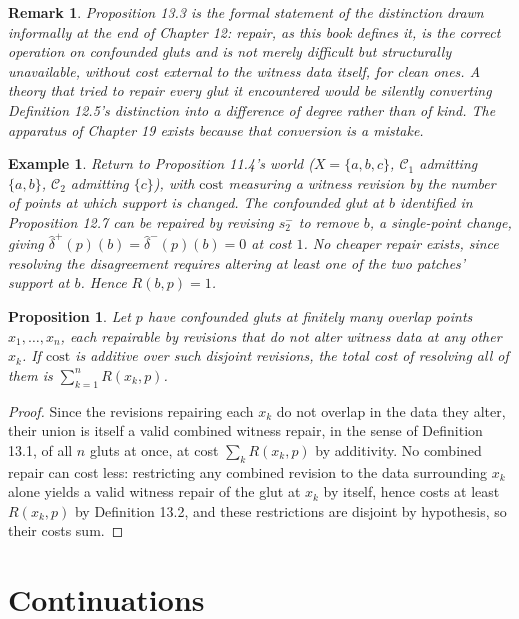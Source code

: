 \documentclass[11pt]{book}
\newtheorem{proposition}[theorem]{Proposition}
\newtheorem{remark}[theorem]{Remark}
\newtheorem{example}[theorem]{Example}
\begin{document}
\begin{remark}
Proposition 13.3 is the formal statement of the distinction drawn informally at the end of Chapter 12: repair, as this book defines it, is the correct operation on confounded gluts and is not merely difficult but structurally unavailable, without cost external to the witness data itself, for clean ones. A theory that tried to repair every glut it encountered would be silently converting Definition 12.5's distinction into a difference of degree rather than of kind. The apparatus of Chapter 19 exists because that conversion is a mistake.
\end{remark}

\begin{example}
Return to Proposition 11.4's world ($X=\{a,b,c\}$, $\mathcal C_1$ admitting $\{a,b\}$, $\mathcal C_2$ admitting $\{c\}$), with $\mathrm{cost}$ measuring a witness revision by the number of points at which support is changed. The confounded glut at $b$ identified in Proposition 12.7 can be repaired by revising $s_2^-$ to remove $b$, a single-point change, giving $\hat\delta^+(p)(b) = \hat\delta^-(p)(b) = 0$ at cost $1$. No cheaper repair exists, since resolving the disagreement requires altering at least one of the two patches' support at $b$. Hence $R(b,p) = 1$.
\end{example}

\begin{proposition}
Let $p$ have confounded gluts at finitely many overlap points $x_1,\dots,x_n$, each repairable by revisions that do not alter witness data at any other $x_k$. If $\mathrm{cost}$ is additive over such disjoint revisions, the total cost of resolving all of them is $\sum_{k=1}^n R(x_k,p)$.
\end{proposition}

\begin{proof}
Since the revisions repairing each $x_k$ do not overlap in the data they alter, their union is itself a valid combined witness repair, in the sense of Definition 13.1, of all $n$ gluts at once, at cost $\sum_k R(x_k,p)$ by additivity. No combined repair can cost less: restricting any combined revision to the data surrounding $x_k$ alone yields a valid witness repair of the glut at $x_k$ by itself, hence costs at least $R(x_k,p)$ by Definition 13.2, and these restrictions are disjoint by hypothesis, so their costs sum.
\end{proof}

\chapter{Continuations}
\end{document}
